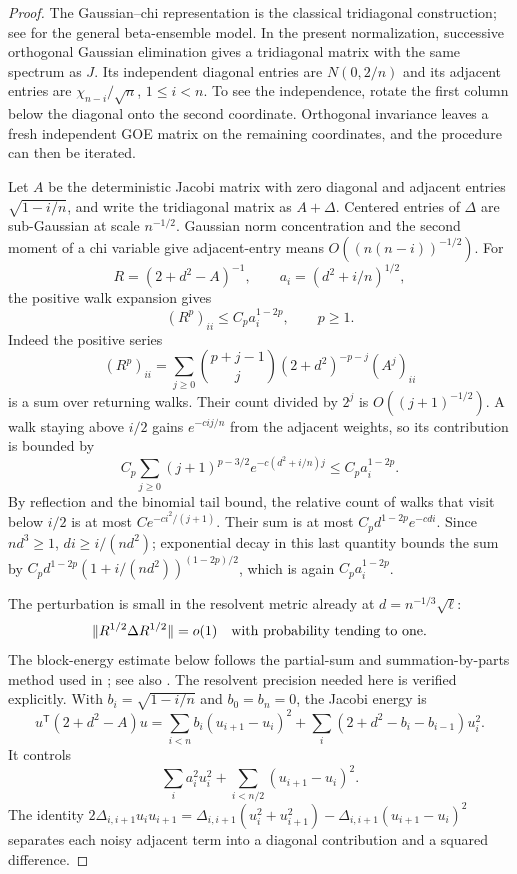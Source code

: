 \begin{proof}
The Gaussian--chi representation is the classical tridiagonal
construction; see \cite[Theorem~2.1 and Section~2.3]{DumitriuEdelman2002}
for the general beta-ensemble model.  In the present normalization,
successive orthogonal Gaussian elimination gives a tridiagonal matrix
with the same spectrum as $J$.  Its independent diagonal entries are
$N(0,2/n)$ and its adjacent entries are $\chi_{n-i}/\sqrt n$,
$1\le i<n$.  To see the independence, rotate the first column below
the diagonal onto the second coordinate.  Orthogonal invariance leaves
a fresh independent GOE matrix on the remaining coordinates, and the
procedure can then be iterated.

Let $A$ be the deterministic Jacobi matrix with zero diagonal and
adjacent entries $\sqrt{1-i/n}$, and write the tridiagonal matrix as
$A+\Delta$.  Centered entries of $\Delta$ are sub-Gaussian at scale
$n^{-1/2}$.  Gaussian norm concentration and the second moment of a
chi variable give adjacent-entry means
$O((n(n-i))^{-1/2})$.  For
\[
 R=(2+d^2-A)^{-1},\qquad a_i=(d^2+i/n)^{1/2},
\]
the positive walk expansion gives
\begin{equation}\label{prof:eq:jacobi-diagonals}
 (R^p)_{ii}\le C_p a_i^{1-2p},\qquad p\ge1.
\end{equation}
Indeed the positive series
\[
 (R^p)_{ii}
 =\sum_{j\ge0}\binom{p+j-1}{j}
       (2+d^2)^{-p-j}(A^j)_{ii}
\]
is a sum over returning walks. Their count divided by $2^j$ is
$O((j+1)^{-1/2})$. A walk staying above $i/2$ gains
$e^{-cij/n}$ from the adjacent weights, so its contribution is bounded by
\[
 C_p\sum_{j\ge0}(j+1)^{p-3/2}
          e^{-c(d^2+i/n)j}\le C_p a_i^{1-2p}.
\]
By reflection and the binomial tail bound, the relative count of walks
that visit below $i/2$ is at most $Ce^{-ci^2/(j+1)}$. Their sum is at
most $C_p d^{1-2p}e^{-cdi}$. Since $nd^3\ge1$,
$di\ge i/(nd^2)$; exponential decay in this last quantity bounds the
sum by $C_p d^{1-2p}(1+i/(nd^2))^{(1-2p)/2}$, which is again
$C_pa_i^{1-2p}$.

The perturbation is small in the resolvent metric already at
$d=n^{-1/3}\sqrt\ell$:
\begin{equation}\label{prof:eq:relative-noise}
 \|R^{1/2}\Delta R^{1/2}\|=o(1)
 \quad\hbox{with probability tending to one}.
\end{equation}
The block-energy estimate below follows the partial-sum and
summation-by-parts method used in
\cite[Proposition~7 and Lemmas~8--9]{LedouxRider2010}; see also
\cite[Lemma~5.6 and Section~6]{RamirezRiderVirag2011}.
The resolvent precision needed here is verified explicitly.
With $b_i=\sqrt{1-i/n}$ and $b_0=b_n=0$, the Jacobi energy is
\[
 u^{\mathsf T}(2+d^2-A)u
 =\sum_{i<n}b_i(u_{i+1}-u_i)^2+
   \sum_i(2+d^2-b_i-b_{i-1})u_i^2.
\]
It controls
\[
 \sum_i a_i^2 u_i^2+
 \sum_{i<n/2}(u_{i+1}-u_i)^2.
\]
The identity
$2\Delta_{i,i+1}u_iu_{i+1}
=\Delta_{i,i+1}(u_i^2+u_{i+1}^2)
-\Delta_{i,i+1}(u_{i+1}-u_i)^2$
separates each noisy adjacent term into a diagonal contribution and a
squared difference.


\end{proof}
